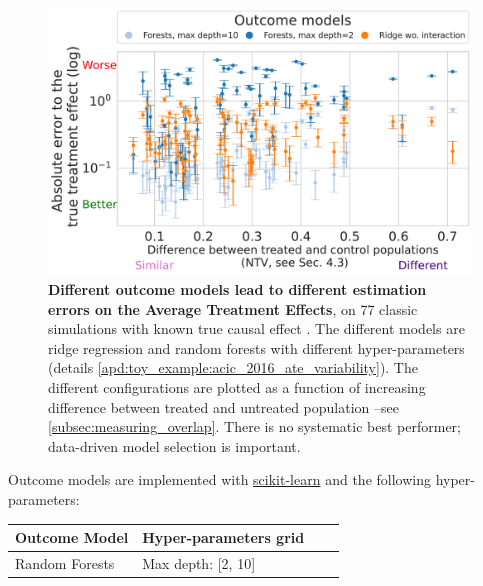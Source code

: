 \documentclass[unnumsec,webpdf,contemporary,large]{oup-authoring-template}%
\theoremstyle{thmstyleone}%
\theoremstyle{thmstyletwo}%
\theoremstyle{thmstylethree}%
\begin{document}
\begin{appendices}

    \begin{figure}[!b]
        \centering
        \includegraphics[width=0.95\linewidth]{2023-03-08-11-10-28_acic_2016_ate_heterogeneity.parquet_abs_bias_ylog_scale=True.pdf}%
        \caption{\textbf{Different outcome models lead to different
                estimation errors on the Average Treatment Effects},
            on 77 classic simulations with known true causal effect
            \cite{dorie_automated_2019}. The different models are ridge regression
            and random forests with different hyper-parameters
            (details
            \ref{apd:toy_example:acic_2016_ate_variability}). The different configurations are
            plotted as a function of increasing difference between treated and
            untreated population --see
            \autoref{subsec:measuring_overlap}.
            There is no systematic best performer; data-driven model
            selection is important.
            \label{fig:acic_2016_ate_heterogeneity}%
        }
    \end{figure}

    Outcome models are implemented with
    \href{https://scikit-learn.org/stable/}{scikit-learn}
    \cite{pedregosa_scikitlearn_2011} and the following hyper-parameters:

    \begin{table}[h!]
        \centering
        \begin{tabular}{llll}
            \toprule
            Outcome Model                                  & Hyper-parameters grid
            \\
            \midrule
            Random Forests                                 & Max depth: [2,
            10]                                                                    \\


\end{tabular}
\end{table}
\end{appendices}
\end{document}
